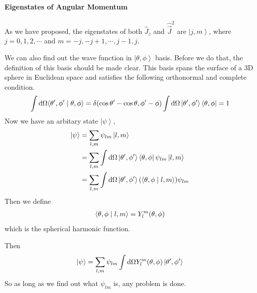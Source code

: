\documentclass[letterpaper,10pt,english]{sphinxmanual}
\newcommand{\bra}[1]{\left\langle #1\right|}
\newcommand{\ket}[1]{\left| #1\right\rangle}
\newcommand{\braket}[2]{\langle #1 \mid #2 \rangle}
\begin{document}
\paragraph{Eigenstates of Angular Momentum}
\label{Quantum/QuantumMechanics2:eigenstates-of-angular-momentum}
As we have proposed, the eigenstates of both \(\hat J_z\) and \(\hat{\vec J}^2\) are \(\ket{j,m}\), where \(j=0,1,2,\cdots\) and \(m=-j,-j+1,\cdots, j-1,j\).

We can also find out the wave function in \({\ket{\theta,\phi } }\) basis. Before we do that, the definition of this basis should be made clear. This basis spans the surface of a 3D sphere in Euclidean space and satisfies the following orthonormal and complete condition.
\begin{gather}
\begin{split}\int \mathrm d \Omega \braket{\theta',\phi'}{\theta,\phi} = \delta(\cos\theta'-\cos\theta,\phi'-\phi)
\int \mathrm d \Omega \ket{\theta',\phi'}\bra{\theta,\phi} = 1\end{split}\notag
\end{gather}
Now we have an arbitary state \(\ket{\psi}\),
\begin{gather}
\begin{split}\ket{\psi} &= \sum _ {l,m} \psi _ {lm}\ket{l,m} \\
           &= \sum _ {l,m} \int \mathrm d \Omega \ket{\theta',\phi'}\bra{\theta,\phi} \psi _ {lm}\ket{l,m} \\
           &= \sum _ {l,m} \int \mathrm d \Omega \ket{\theta',\phi'} (\braket{\theta,\phi}{l,m} ) \psi _ {lm} \\\end{split}\notag
\end{gather}
Then we define
\begin{gather}
\begin{split}\braket{\theta,\phi}{l,m}=Y_l^m(\theta,\phi)\end{split}\notag
\end{gather}
which is the spherical harmonic function.

Then
\begin{gather}
\begin{split}\ket{\psi} &= \sum _ {l,m} \psi _ {lm} \int \mathrm d \Omega   Y_l^m(\theta,\phi) \ket{\theta',\phi'}  \\\end{split}\notag
\end{gather}
So as long as we find out what \(\psi _ {lm}\) is, any problem is done.
\end{document}
